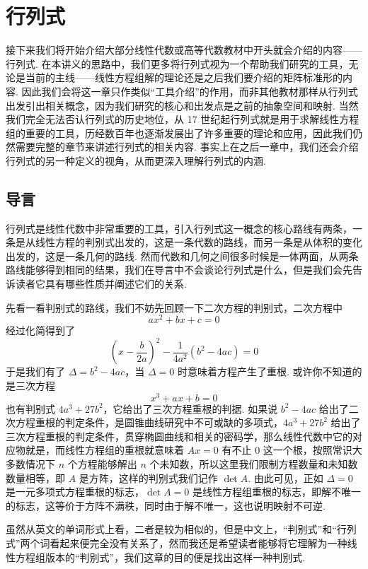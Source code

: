 \chapter{行列式}

接下来我们将开始介绍大部分线性代数或高等代数教材中开头就会介绍的内容——行列式. 在本讲义的思路中，我们更多将行列式视为一个帮助我们研究的工具，无论是当前的主线——线性方程组解的理论还是之后我们要介绍的矩阵标准形的内容. 因此我们会将这一章只作类似``工具介绍''的作用，而非其他教材那样从行列式出发引出相关概念，因为我们研究的核心和出发点是之前的抽象空间和映射. 当然我们完全无法否认行列式的历史地位，从 17 世纪起行列式就是用于求解线性方程组的重要的工具，历经数百年也逐渐发展出了许多重要的理论和应用，因此我们仍然需要完整的章节来讲述行列式的相关内容. 事实上在之后一章中，我们还会介绍行列式的另一种定义的视角，从而更深入理解行列式的内涵.

\section{导言}

行列式是线性代数中非常重要的工具，引入行列式这一概念的核心路线有两条，一条是从线性方程的判别式出发的，这是一条代数的路线，而另一条是从体积的变化出发的，这是一条几何的路线. 然而代数和几何之间很多时候是一体两面，从两条路线能够得到相同的结果，我们在导言中不会谈论行列式是什么，但是我们会先告诉读者它具有哪些性质并阐述它们的关系.

先看一看判别式的路线，我们不妨先回顾一下二次方程的判别式，二次方程中
$$
ax^2 + bx + c = 0
$$
经过化简得到了
$$
\left(x- \frac{b}{2a}\right)^2 - \frac1{4a^2}(b^2 - 4ac) = 0
$$
于是我们有了 $\Delta = b^2 - 4ac$，当 $\Delta = 0$ 时意味着方程产生了重根. 或许你不知道的是三次方程
$$
x^3+ax+b=0
$$
也有判别式 $4a^3 + 27b^2$，它给出了三次方程重根的判据. 如果说 $b^2 - 4ac$ 给出了二次方程重根的判定条件，是圆锥曲线研究中不可或缺的多项式，$4a^3+27b^2$ 给出了三次方程重根的判定条件，贯穿椭圆曲线和相关的密码学，那么线性代数中它的对应物就是，而线性方程组的重根就意味着 $Ax=0$ 有不止 $0$ 这一个根，按照常识大多数情况下 $n$ 个方程能够解出 $n$ 个未知数，所以这里我们限制方程数量和未知数数量相等，即 $A$ 是方阵，这样的判别式我们记作 $\det A$. 由此可见，正如 $\Delta = 0$ 是一元多项式方程重根的标志，$\det A = 0$ 是线性方程组重根的标志，即解不唯一的标志，这等价于方阵不满秩，同时由于解不唯一，这也说明映射不可逆.

虽然从英文的单词形式上看，二者是较为相似的，但是中文上，``判别式''和``行列式''两个词看起来便完全没有关系了，然而我还是希望读者能够将它理解为一种线性方程组版本的``判别式''，我们这章的目的便是找出这样一种判别式.

